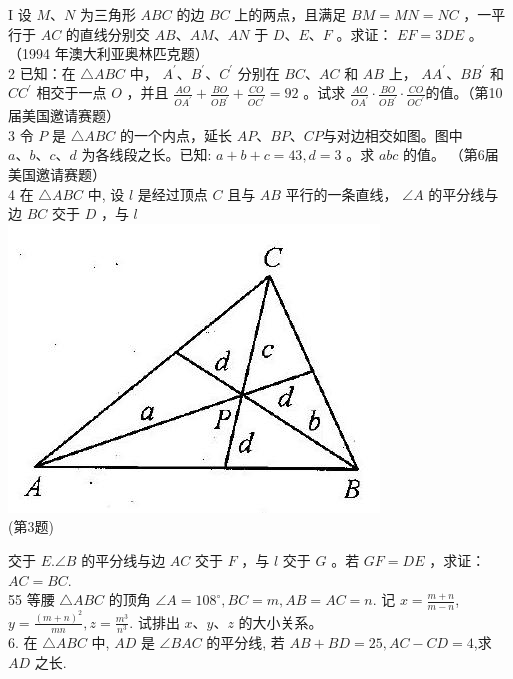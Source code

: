 \documentclass[10pt]{article}
\begin{document}
I 设 $M 、 N$ 为三角形 $A B C$ 的边 $B C$ 上的两点，且满足 $B M=M N=N C$ ，一平行于 $A C$ 的直线分别交 $A B 、 A M 、 A N$ 于 $D 、 E 、 F$ 。求证： $E F=3 D E$ 。 （1994 年澳大利亚奥林匹克题）\\
2 已知：在 $\triangle A B C$ 中， $A^{\prime} 、 B^{\prime} 、 C^{\prime}$ 分别在 $B C 、 A C$ 和 $A B$ 上， $A A^{\prime} 、 B B^{\prime}$ 和 $C C^{\prime}$ 相交于一点 $O$ ，并且 $\frac{A O}{O A^{\prime}}+\frac{B O}{O B^{\prime}}+\frac{C O}{O C^{\prime}}=92$ 。试求 $\frac{A O}{O A^{\prime}} \cdot \frac{B O}{O B^{\prime}} \cdot \frac{C O}{O C^{\prime}}$的值。（第10届美国邀请赛题）\\
3 令 $P$ 是 $\triangle A B C$ 的一个内点，延长 $A P 、 B P 、 C P$与对边相交如图。图中 $a 、 b 、 c 、 d$ 为各线段之长。已知: $a+b+c=43, d=3$ 。求 $a b c$ 的值。 （第6届美国邀请赛题）\\
4 在 $\triangle A B C$ 中, 设 $l$ 是经过顶点 $C$ 且与 $A B$ 平行的一条直线， $\angle A$ 的平分线与边 $B C$ 交于 $D$ ，与 $l$\\
\includegraphics[max width=\textwidth, center]{2024_10_30_2c8f45efd4a519b08e1ag-043}\\
(第3题)

交于 $E . \angle B$ 的平分线与边 $A C$ 交于 $F$ ，与 $l$ 交于 $G$ 。若 $G F=D E$ ，求证： $A C=B C$.\\
55 等腰 $\triangle A B C$ 的顶角 $\angle A=108^{\circ}, B C=m, A B=A C=n$. 记 $x=\frac{m+n}{m-n}$, $y=\frac{(m+n)^{2}}{m n}, z=\frac{m^{3}}{n^{3}}$. 试排出 $x 、 y 、 z$ 的大小关系。\\
6. 在 $\triangle A B C$ 中, $A D$ 是 $\angle B A C$ 的平分线, 若 $A B+B D=25, A C-C D=4$,求 $A D$ 之长.
\end{document}
